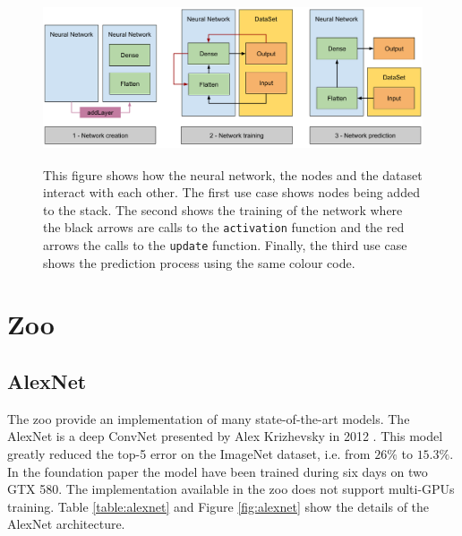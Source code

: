 \documentclass[11pt]{report}
\begin{document}
\begin{figure}[h]
\centering
\includegraphics[width=15cm, height=5cm]{neural_network}
\caption[Interactions between neural network, nodes and dataset]{This figure shows how the neural network, the nodes and the dataset interact with each other. The first use case shows nodes being added to the stack. The second shows the training of the network where the black arrows are calls to the \texttt{activation} function and the red arrows the calls to the \texttt{update} function. Finally, the third use case shows the prediction process using the same colour code.}
\end{figure}
\newpage

\section{Zoo}

\subsection{AlexNet}

The zoo provide an implementation of many state-of-the-art models. The AlexNet is a deep ConvNet presented by Alex Krizhevsky in 2012 \cite{DBLP:journals/cacm/KrizhevskySH17}. This 
model greatly reduced the top-5 error on the ImageNet dataset, i.e. from $26\%$ to $15.3\%$. In the foundation paper the model have been trained during six days on two GTX 580. The implementation available in the zoo does not support multi-GPUs training. Table \ref{table:alexnet} and Figure \ref{fig:alexnet} show the details of the AlexNet architecture. 
\end{document}
